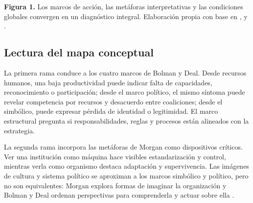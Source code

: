 \documentclass[spanish,letterpaper,oneside]{article}
\begin{document}
\begin{landscape}
{}

\par\vspace{0.03cm}
\begin{minipage}{0.88\linewidth}
\centering\scriptsize
\textbf{Figura 1.} Los marcos de acción, las metáforas interpretativas y las condiciones globales convergen en un diagnóstico integral. Elaboración propia con base en \citeauthor{bolmanDeal2021}, \citeauthor{morgan2006} y \citeauthor{bright2019}.
\end{minipage}
\endgroup
\end{landscape}

\subsection{Lectura del mapa conceptual}

La primera rama conduce a los cuatro marcos de Bolman y Deal. Desde recursos humanos, una baja productividad puede indicar falta de capacidades, reconocimiento o participación; desde el marco político, el mismo síntoma puede revelar competencia por recursos y desacuerdo entre coaliciones; desde el simbólico, puede expresar pérdida de identidad o legitimidad. El marco estructural pregunta si responsabilidades, reglas y procesos están alineados con la estrategia.

La segunda rama incorpora las metáforas de Morgan como dispositivos críticos. Ver una institución como máquina hace visibles estandarización y control, mientras verla como organismo destaca adaptación y supervivencia. Las imágenes de cultura y sistema político se aproximan a los marcos simbólico y político, pero no son equivalentes: Morgan explora formas de imaginar la organización y Bolman y Deal ordenan perspectivas para comprenderla y actuar sobre ella \citep{bolmanDeal2021,morgan2006}.
\end{document}
